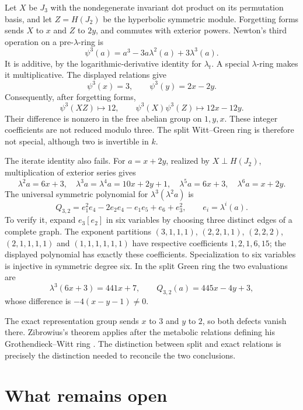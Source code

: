 \documentclass[11pt,a4paper]{article}
\theoremstyle{definition}\newtheorem{definition}[theorem]{Definition}
\theoremstyle{remark}\newtheorem{remark}[theorem]{Remark}
\begin{document}
Let $X$ be $J_3$ with the nondegenerate invariant dot product on
its permutation basis, and let $Z=H(J_2)$ be the hyperbolic
symmetric module.  Forgetting forms sends $X$ to $x$ and $Z$ to
$2y$, and commutes with exterior powers.  Newton's third operation
on a pre-$\lambda$-ring is
\[
 \psi^3(a)=a^3-3a\lambda^2(a)+3\lambda^3(a).
\]
It is additive, by the logarithmic-derivative identity for
$\lambda_t$.  A special $\lambda$-ring makes it multiplicative.
The displayed relations give
\[
 \psi^3(x)=3,\qquad \psi^3(y)=2x-2y.
\]
Consequently, after forgetting forms,
\[
 \psi^3(XZ)\longmapsto12,\qquad
 \psi^3(X)\psi^3(Z)\longmapsto12x-12y.
\]
Their difference is nonzero in the free abelian group on $1,y,x$.
These integer coefficients are not reduced modulo three.
The split Witt--Green ring is therefore not special, although two
is invertible in $k$.

The iterate identity also fails.  For $a=x+2y$, realized by
$X\perp H(J_2)$, multiplication of exterior series gives
\[
 \lambda^2a=6x+3,\quad
 \lambda^3a=\lambda^4a=10x+2y+1,\quad
 \lambda^5a=6x+3,\quad\lambda^6a=x+2y.
\]
The universal symmetric polynomial for $\lambda^3(\lambda^2a)$ is
\[
 Q_{3,2}=e_1^2e_4-2e_2e_4-e_1e_5+e_6+e_3^2,
 \qquad e_i=\lambda^i(a).
\]
To verify it, expand $e_3[e_2]$ in six variables by choosing three
distinct edges of a complete graph.  The exponent partitions
$(3,1,1,1)$, $(2,2,1,1)$, $(2,2,2)$, $(2,1,1,1,1)$ and
$(1,1,1,1,1,1)$ have respective coefficients $1,2,1,6,15$;
the displayed polynomial has exactly these coefficients.
Specialization to six variables is injective in symmetric degree
six.  In the split Green ring the two evaluations are
\[
 \lambda^3(6x+3)=441x+7,\qquad Q_{3,2}(a)=445x-4y+3,
\]
whose difference is $-4(x-y-1)\ne0$.

The exact representation group sends $x$ to $3$ and $y$ to $2$,
so both defects vanish there.  Zibrowius's theorem applies after
the metabolic relations defining his Grothendieck--Witt ring
\citep[Definition~1.2, p.~1060]{Zibrowius2015}.  The distinction
between split and exact relations is precisely the distinction
needed to reconcile the two conclusions.



\section{What remains open}
\end{document}
